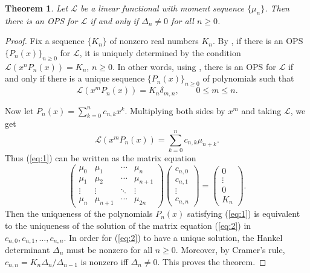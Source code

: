 \documentclass[oneside]{book}
\numberwithin{equation}{section}
\newtheorem{thm}{Theorem}[section]
\theoremstyle{definition}
\newcommand\LL{\mathcal{L}}
\begin{document}
\begin{thm}\label{thm:Dne0}
  Let \( \LL \) be a linear functional with moment sequence
  \( \{\mu_n\} \).
  Then there is an OPS for \( \LL \) if and only if
  \( \Delta_n\ne 0 \) for all \( n\ge0 \).
\end{thm}

\begin{proof}
  Fix a sequence \( \{K_n\} \) of nonzero real numbers \( K_n \). By
  , if there is an OPS
  \( \{ P_n(x) \}_{n\ge 0} \) for \( \LL \), it is uniquely determined
  by the condition \( \LL(x^n P_n(x)) = K_n \), \( n\ge0 \). In other
  words, using , there is an OPS for \( \LL \) if
  and only if there is a unique sequence \( \{ P_n(x) \}_{n\ge 0} \)
  of polynomials such that
  \begin{equation}\label{eq:1}
    \LL(x^mP_n(x)) = K_n \delta_{m,n}, \qquad 0\le m\le n.
  \end{equation}
  
  Now let \( P_n(x) = \sum_{k=0}^{n} c_{n,k} x^k \). Multiplying both
  sides by \( x^m \) and taking \( \LL \), we get
  \[
    \LL(x^mP_n(x)) = \sum_{k=0}^{n} c_{n,k} \mu_{n+k}.
  \]
  Thus (\ref{eq:1}) can be written as the matrix equation
  \begin{equation}\label{eq:2}
   \begin{pmatrix}
     \mu_0 & \mu_1 & \cdots & \mu_n\\
     \mu_1 & \mu_2 & \cdots & \mu_{n+1}\\
     \vdots & \vdots & \ddots & \vdots\\
     \mu_n & \mu_{n+1} & \cdots & \mu_{2n}
   \end{pmatrix}
\begin{pmatrix}
c_{n,0} \\ c_{n,1} \\ \vdots \\ c_{n,n}
\end{pmatrix} 
= \begin{pmatrix}
0 \\ \vdots \\ 0 \\ K_n
\end{pmatrix}. 
  \end{equation}
  Then the uniqueness of the polynomials \( P_n(x) \) satisfying
  (\ref{eq:1}) is equivalent to the uniqueness of the solution of the
  matrix equation (\ref{eq:2}) in \( c_{n,0},c_{n,1},\dots,c_{n,n} \).
  In order for (\ref{eq:2}) to have a unique solution, the Hankel
  determinant \( \Delta_n \) must be nonzero for all \( n\ge0 \).
  Moreover, by Cramer's rule, \( c_{n,n} = K_n\Delta_n/\Delta_{n-1} \)
  is nonzero iff \( \Delta_n\ne 0 \). This proves the theorem.
\end{proof}
\end{document}
